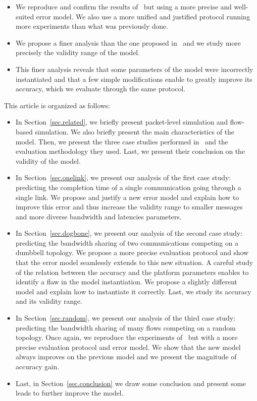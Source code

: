 \documentclass{sig-alternate}
\begin{document}
\begin{itemize}
\item We reproduce and confirm the results of~\cite{nstools07} but
  using a more precise and well-suited error model. We also use a more
  unified and justified protocol running more experiments than
  what was previously done.
\item We propose a finer analysis than the one proposed
  in~\cite{nstools07} and we study more precisely the validity range
  of the \simgrid model.
\item This finer analysis reveals that some parameters of the \simgrid
  model were incorrectly instantiated and that a few simple
  modifications enable to greatly improve its accuracy, which we
  evaluate through the same protocol.
\end{itemize}

This article is organized as follows:

\begin{itemize}
\item In Section~\ref{sec.related}, we briefly present packet-level
  simulation and flow-based simulation. We also briefly present the
  main characteristics of the \simgrid model. Then, we present the
  three case studies performed in~\cite{nstools07} and the evaluation
  methodology they used. Last, we present their conclusion on the
  validity of the \simgrid model.
\item In Section~\ref{sec.onelink}, we present our analysis of the
  first case study: predicting the completion time of a single
  communication going through a single link. We propose and justify a
  new error model and explain how to improve this error and thus
  increase the validity range to smaller messages and more diverse
  bandwidth and latencies parameters.
\item In Section~\ref{sec.dogbone}, we present our analysis of the
  second case study: predicting the bandwidth sharing of two
  communications competing on a dumbbell topology. We propose a more
  precise evaluation protocol and show that the error model seamlessly
  extends to this new situation. A careful study of the relation
  between the accuracy and the platform parameters enables to identify
  a flaw in the model instantiation. We propose a slightly different
  model and explain how to instantiate it correctly. Last, we study its
  accuracy and its validity range.
\item In Section~\ref{sec.random}, we present our analysis of the
  third case study: predicting the bandwidth sharing of many flows
  competing on a random topology. Once again, we reproduce the
  experiments of~\cite{nstools07} but with a more precise evaluation
  protocol and error model. We show that the new model always improves
  on the previous model and we present the magnitude of accuracy gain.
\item Last, in Section~\ref{sec.conclusion} we draw some conclusion
  and present some leads to further improve the \simgrid model.
\end{itemize}
\end{document}
